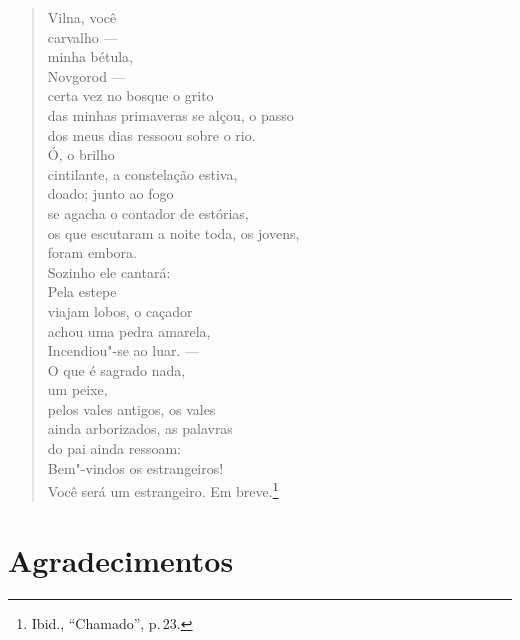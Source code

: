 %
\begin{verse}
Vilna, você\\
carvalho ---\\
minha bétula,\\
Novgorod ---\\
certa vez no bosque o grito\\
das minhas primaveras se alçou, o passo\\
dos meus dias ressoou sobre o rio.\\[10pt]
Ó, o brilho\\
cintilante, a constelação estiva,\\
doado; junto ao fogo\\
se agacha o contador de estórias,\\
os que escutaram a noite toda, os jovens,\\
foram embora.\\[10pt]
Sozinho ele cantará:\\
Pela estepe\\
viajam lobos, o caçador\\
achou uma pedra amarela,\\
Incendiou"-se ao luar. ---\\[10pt]
O que é sagrado nada,\\
um peixe,\\
pelos vales antigos, os vales\\
ainda arborizados, as palavras\\
do pai ainda ressoam:\\
Bem"-vindos os estrangeiros!\\
Você será um estrangeiro. Em breve.\footnote{Ibid., ``Chamado'', p.\,23.}
\end{verse}

\chapter{Agradecimentos}

